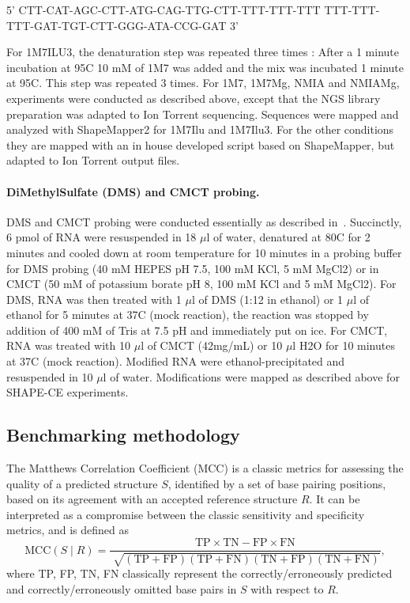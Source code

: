 \documentclass[a4,center,fleqn]{NAR}
\newcommand{\Ref}{R}
\begin{document}
{\centering {}%
5' CTT-CAT-AGC-CTT-ATG-CAG-TTG-CTT-TTT-TTT-TTT
   TTT-TTT-TTT-GAT-TGT-CTT-GGG-ATA-CCG-GAT 3'\\}

For 1M7ILU3, the denaturation step was repeated three times : After a 1 minute incubation at 95\degree{}C 10 mM of 1M7 was added and the mix was incubated 1 minute at 95\degree{}C. This step was repeated 3 times. For 1M7, 1M7Mg, NMIA and NMIAMg, experiments were conducted as described above, except that the NGS library preparation was adapted to Ion Torrent sequencing. Sequences were mapped and analyzed with ShapeMapper2 for 1M7Ilu and 1M7Ilu3. For the other conditions they are mapped with an in house developed script based on ShapeMapper, but adapted to Ion Torrent output files.


\paragraph{DiMethylSulfate (DMS) and CMCT probing.}
DMS and CMCT probing were conducted essentially as described in~\cite{Weill2004,James2008}. Succinctly, 6 pmol of RNA were resuspended in 18 $\mu$l of water, denatured at 80\degree{}C for 2 minutes and cooled down at room temperature for 10 minutes in a probing buffer for DMS probing (40 mM HEPES pH 7.5, 100 mM KCl, 5 mM MgCl2) or in CMCT (50 mM of potassium borate pH 8, 100 mM KCl and 5 mM MgCl2). For DMS, RNA was then treated with 1 $\mu$l of DMS (1:12 in ethanol) or 1 $\mu$l of ethanol for 5 minutes at 37\degree{}C (mock reaction), the reaction was stopped by addition of 400 mM of Tris at 7.5 pH and immediately put on ice. For CMCT,  RNA was treated with 10 $\mu$l of CMCT (42mg/mL) or 10 $\mu$l H2O for 10 minutes at 37\degree{}C (mock reaction). Modified RNA were ethanol-precipitated and resuspended in 10 $\mu$l of water. Modifications were mapped as described above for SHAPE-CE experiments.


\subsection{Benchmarking methodology}

The Matthews Correlation Coefficient (MCC) is a classic metrics for assessing the quality of a predicted structure $S$, identified by a set of base pairing positions, based on its agreement with an accepted reference structure $\Ref$. It can be interpreted as a compromise between the classic sensitivity and specificity metrics, and is defined as 
$$\text{MCC}(S\mid \Ref)=\frac{\text{TP} \times \text{TN} -\text{FP} \times \text{FN}}{\sqrt[]{(\text{TP}+\text{FP})(\text{TP}+\text{FN})(\text{TN}+\text{FP})(\text{TN}+\text{FN})}},$$
where TP, FP, TN, FN classically represent the correctly/erroneously predicted and correctly/erroneously omitted base pairs in $S$ with respect to $\Ref$.
\end{document}
